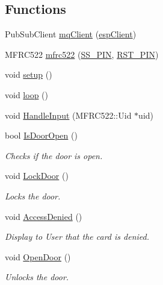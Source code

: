 \subsection*{Functions}
\begin{DoxyCompactItemize}
\item 
Pub\+Sub\+Client \mbox{\hyperlink{_hodoor_8ino_a3723ecd4627fe1acd7f94dd266f1105a}{mq\+Client}} (\mbox{\hyperlink{_snap_box_8ino_abd77e757e4b3bb6f1e4b42b21ea9e040}{esp\+Client}})
\item 
M\+F\+R\+C522 \mbox{\hyperlink{_hodoor_8ino_ac672f817299d07cc428fe3f456235273}{mfrc522}} (\mbox{\hyperlink{_hodoor_8ino_a86fac98c9b4c98a3e50fc45440878391}{S\+S\+\_\+\+P\+IN}}, \mbox{\hyperlink{_hodoor_8ino_a36932b0e869e0114f32e255f61306d6b}{R\+S\+T\+\_\+\+P\+IN}})
\item 
void \mbox{\hyperlink{_hodoor_8ino_a4fc01d736fe50cf5b977f755b675f11d}{setup}} ()
\item 
void \mbox{\hyperlink{_hodoor_8ino_afe461d27b9c48d5921c00d521181f12f}{loop}} ()
\item 
void \mbox{\hyperlink{_hodoor_8ino_a98675754ce81a9e1a94fa2835d88d9d3}{Handle\+Input}} (M\+F\+R\+C522\+::\+Uid $\ast$uid)
\item 
bool \mbox{\hyperlink{_hodoor_8ino_afbe526681d5cfb592beb5df86c387c56}{Is\+Door\+Open}} ()
\begin{DoxyCompactList}\small\item\em Checks if the door is open. \end{DoxyCompactList}\item 
void \mbox{\hyperlink{_hodoor_8ino_a01c01d3be09b769c607eb96c37d300d3}{Lock\+Door}} ()
\begin{DoxyCompactList}\small\item\em Locks the door. \end{DoxyCompactList}\item 
void \mbox{\hyperlink{_hodoor_8ino_a4154ba1797b309f61d68281984831f24}{Access\+Denied}} ()
\begin{DoxyCompactList}\small\item\em Display to User that the card is denied. \end{DoxyCompactList}\item 
void \mbox{\hyperlink{_hodoor_8ino_a6eba9e4464d54ec1dad2519781313b12}{Open\+Door}} ()
\begin{DoxyCompactList}\small\item\em Unlocks the door. \end{DoxyCompactList}\item 

\end{DoxyCompactItemize}
